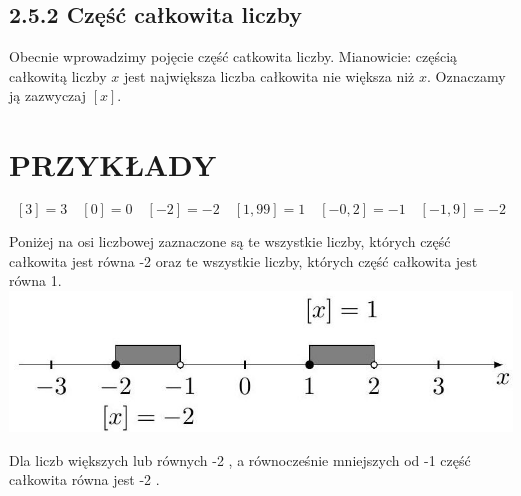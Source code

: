 \documentclass[10pt]{article}
\begin{document}
\subsection*{2.5.2 Część całkowita liczby}
Obecnie wprowadzimy pojęcie część catkowita liczby. Mianowicie: częścią całkowitą liczby \(x\) jest największa liczba całkowita nie większa niż \(x\). Oznaczamy ją zazwyczaj \([x]\).

\section*{PRZYKŁADY}
\[
[3]=3 \quad[0]=0 \quad[-2]=-2 \quad[1,99]=1 \quad[-0,2]=-1 \quad[-1,9]=-2
\]

Poniżej na osi liczbowej zaznaczone są te wszystkie liczby, których część całkowita jest równa -2 oraz te wszystkie liczby, których część całkowita jest równa 1.\\
\includegraphics[max width=\textwidth, center]{2024_11_21_8f01584889ff06348ae7g-048}

Dla liczb większych lub równych -2 , a równocześnie mniejszych od -1 część całkowita równa jest -2 .
\end{document}
